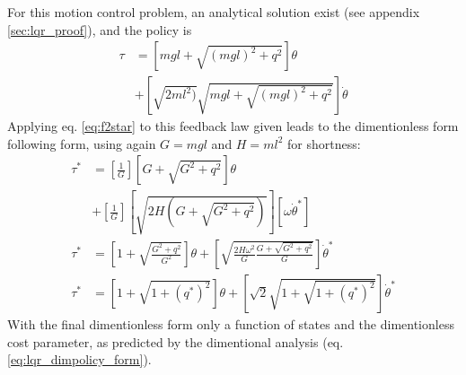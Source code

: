For this motion control problem, an analytical solution exist (see appendix \ref{sec:lqr_proof}), and the policy is
\begin{align}
\tau &= 
\left[
mgl +
\sqrt{ (mgl)^2 + q^2} \right] \theta
\\ &+
\left[
\sqrt{ 2 ml^2)} \sqrt{mgl+ \sqrt{ (mgl)^2 + q^2}}
\right] \dot{\theta}
\label{eq:lqr_policy}
\end{align}
Applying eq. \eqref{eq:f2star} to this feedback law given leads to the dimentionless form following form, using again $G=mgl$ and $H=ml^2$ for shortness:
\begin{align}
\tau^* &= \left[\frac{1}{G}\right] 
\left[ G + \sqrt{G^2+q^2}\right] \theta \\& + \left[\frac{1}{G}\right] \left[\sqrt{2H(G+\sqrt{G^2+q^2})}
\right] \left[\omega \dot{\theta}^*\right] \\
\tau^* &= 
\left[ 1 + \sqrt{\frac{G^2+q^2}{G^2}}\right] \theta + \left[\sqrt{\frac{2H\omega^2}{G}\frac{G+\sqrt{G^2+q^2}}{G}}
\right] \dot{\theta}^* \\
\tau^* &= 
\left[
1 + \sqrt{ 1 + (q^*)^2}
\right] \theta
+
\left[
\sqrt{2} \sqrt{ 1 + \sqrt{ 1 + (q^*)^2}}
\right] \dot{\theta}^*
\end{align}
With the final dimentionless form only a function of states and the dimentionless cost parameter, as predicted by the dimentional analysis (eq. \eqref{eq:lqr_dimpolicy_form}).

